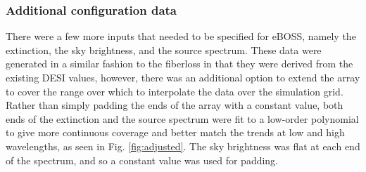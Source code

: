 \subsubsection{Additional configuration data}
\label{sec:additional}

There were a few more inputs that needed to be specified for eBOSS, namely the extinction, the sky brightness, and the source spectrum. These data were generated in a similar fashion to the fiberloss in that they were derived from the existing DESI values, however, there was an additional option to extend the array to cover the range over which to interpolate the data over the simulation grid. Rather than simply padding the ends of the array with a constant value, both ends of the extinction and the source spectrum were fit to a low-order polynomial to give more continuous coverage and better match the trends at low and high wavelengths, as seen in Fig. \ref{fig:adjusted}. The sky brightness was flat at each end of the spectrum, and so a constant value was used for padding. 

